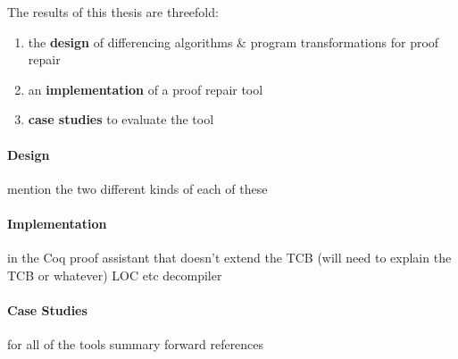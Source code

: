 The results of this thesis are threefold:

\begin{enumerate}
\item the \textbf{design} of differencing algorithms \& program transformations for proof repair
\item an \textbf{implementation} of a proof repair tool 
\item \textbf{case studies} to evaluate the tool
\end{enumerate}

\paragraph{Design}
mention the two different kinds of each of these

\paragraph{Implementation}
\sysname
in the Coq proof assistant that doesn't extend the TCB (will need to explain the TCB or whatever)
LOC etc
decompiler

\paragraph{Case Studies}
for all of the tools
summary
forward references



